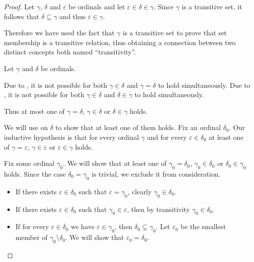 \begin{proof}
   Let \( \gamma \), \( \delta \) and \( \varepsilon \) be ordinals and let \( \varepsilon \in \delta \in \gamma \). Since \( \gamma \) is a transitive set, it follows that \( \delta \subseteq \gamma \) and thus \( \varepsilon \in \gamma \).

  Therefore we have used the fact that \( \gamma \) is a transitive set to prove that set membership is a transitive relation, thus obtaining a connection between two distinct concepts both named \enquote{transitivity}.

   Let \( \gamma \) and \( \delta \) be ordinals.

  Due to , it is not possible for both \( \gamma \in \delta \) and \( \gamma = \delta \) to hold simultaneously. Due to , it is not possible for both \( \gamma \in \delta \) and \( \delta \in \gamma \) to hold simultaneously.

  Thus at most one of \( \gamma = \delta \), \( \gamma \in \delta \) or \( \delta \in \gamma \) holds.

  We will use  on \( \delta \) to show that at least one of them holds. Fix an ordinal \( \delta_0 \). Our inductive hypothesis is that for every ordinal \( \gamma \) and for every \( \varepsilon \in \delta_0 \) at least one of \( \gamma = \varepsilon \), \( \gamma \in \varepsilon \) or \( \varepsilon \in \gamma \) holds.

  Fix some ordinal \( \gamma_0 \). We will show that at least one of \( \gamma_0 = \delta_0 \), \( \gamma_0 \in \delta_0 \) or \( \delta_0 \in \gamma_0 \) holds. Since the case \( \delta_0 = \gamma_0 \) is trivial, we exclude it from consideration.

  \begin{itemize}
    \item If there exists \( \varepsilon \in \delta_0 \) such that \( \varepsilon = \gamma_0 \), clearly \( \gamma_0 \in \delta_0 \).
    \item If there exists \( \varepsilon \in \delta_0 \) such that \( \gamma_0 \in \varepsilon \), then by transitivity \( \gamma_0 \in \delta_0 \).
    \item If for every \( \varepsilon \in \delta_0 \) we have \( \varepsilon \in \gamma_0 \), then \( \delta_0 \subsetneq \gamma_0 \). Let \( \varepsilon_0 \) be the smallest member of \( \gamma_0 \setminus \delta_0 \). We will show that \( \varepsilon_0 = \delta_0 \).


\end{itemize}
\end{proof}
